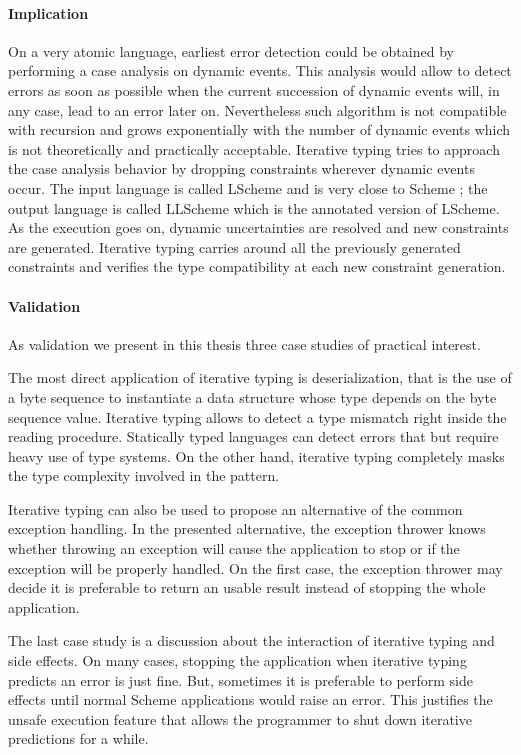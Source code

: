 \documentclass[a4paper]{report}
\begin{document}
\paragraph{Implication} On a very atomic language, earliest error detection could be obtained by performing a case analysis on dynamic events. This analysis would allow to detect errors as soon as possible when the current succession of dynamic events will, in any case, lead to an error later on. Nevertheless such algorithm is not compatible with recursion and grows exponentially with the number of dynamic events which is not theoretically and practically acceptable. Iterative typing tries to approach the case analysis behavior by dropping constraints wherever dynamic events occur. The input language is called LScheme and is very close to Scheme ; the output language is called LLScheme which is the annotated version of LScheme. As the execution goes on, dynamic uncertainties are resolved and new constraints are generated. Iterative typing carries around all the previously generated constraints and verifies the type compatibility at each new constraint generation.

\paragraph{Validation} As validation we present in this thesis three case studies of practical interest.

The most direct application of iterative typing is deserialization, that is the use of a byte sequence to instantiate a data structure whose type depends on the byte sequence value. Iterative typing allows to detect a type mismatch right inside the reading procedure. Statically typed languages can detect errors that but require heavy use of type systems. On the other hand, iterative typing completely masks the type complexity involved in the pattern.

Iterative typing can also be used to propose an alternative of the common exception handling. In the presented alternative, the exception thrower knows whether throwing an exception will cause the application to stop or if the exception will be properly handled. On the first case, the exception thrower may decide it is preferable to return an usable result instead of stopping the whole application.

The last case study is a discussion about the interaction of iterative typing and side effects. On many cases, stopping the application when iterative typing predicts an error is just fine. But, sometimes it is preferable to perform side effects until normal Scheme applications would raise an error. This justifies the unsafe execution feature that allows the programmer to shut down iterative predictions for a while.
\end{document}
